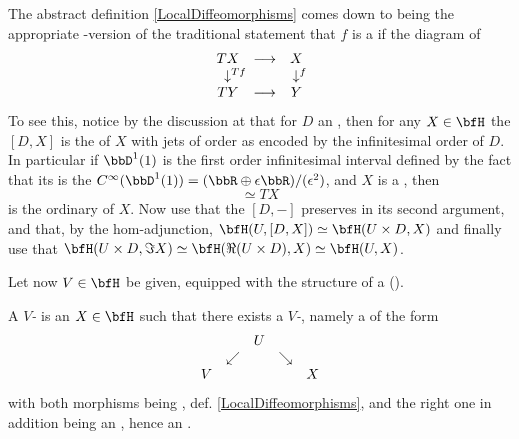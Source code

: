 \begin{remark}
\label{}\hypertarget{}{}
The abstract definition \ref{LocalDiffeomorphisms} comes down to being the appropriate -version of the traditional statement that $f$ is a  if the diagram of 
\begin{displaymath}
\itexarray{
T X &\longrightarrow& X
\\
\downarrow^{\mathrlap{T f}} && \downarrow^{\mathrlap{f}}
\\
T Y &\longrightarrow& Y
}
\end{displaymath}
To see this, notice by the discussion at  that for $D$ an , then for any $X \in \bfH$ the  $[D,X]$ is the  of $X$ with jets of order as encoded by the infinitesimal order of $D$. In particular if $\bbD^1(1)$ is the first order infinitesimal interval defined by the fact that its  is the  $C^\infty(\bbD^1(1)) = (\bbR \oplus \epsilon \bbR)/(\epsilon^2)$, and $X$ is a , then
\begin{displaymath}
[\bbD^1(1), X]\simeq T X
\end{displaymath}
is the ordinary  of $X$. Now use that the  $[D,-]$ preserves  in its second argument, and that, by the hom-adjunction, $\bfH(U, [D,X]) \simeq \bfH(U \times D, X)$ and finally use that $\bfH(U \times D, \Im X)\simeq \bfH(\Re(U \times D), X)\simeq \bfH(U,X)$.
\end{remark}
Let now $V \in \bfH$ be given, equipped with the structure of a  ().
\begin{defn}
\label{VManifold}\hypertarget{VManifold}{}
A \emph{$V$-} is an $X \in \bfH$ such that there exists a \emph{$V$-}, namely a  of the form
\begin{displaymath}
\begin{matrix}
&& U
\\
& \swarrow && \searrow
\\
V && && X
\end{matrix}
\end{displaymath}
with both morphisms being , def. \ref{LocalDiffeomorphisms}, and the right one in addition being an , hence an .
\end{defn}
